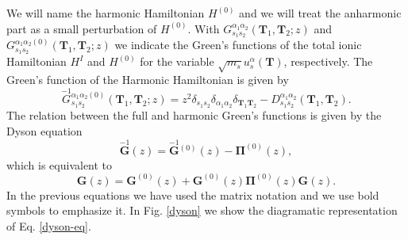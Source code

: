 We will name the harmonic Hamiltonian $H^{(0)}$ and we will treat the anharmonic part as a small perturbation of $H^{(0)}$. With $G_{s_{1}s_{2}}^{\alpha_{1}\alpha_{2}}(\mathbf{T}_{1},\mathbf{T}_{2};z)$ and 
$G_{s_{1}s_{2}}^{\alpha_{1}\alpha_{2}(0)}(\mathbf{T}_{1},\mathbf{T}_{2};z)$ we indicate the Green's functions of the total ionic Hamiltonian $H^{I}$ and $H^{(0)}$ for the variable $\sqrt{m_{s}}u_{s}^{\alpha}(\mathbf{T})$, 
respectively. The Green's function of the Harmonic Hamiltonian is given by
\begin{equation}
 \overset{-1}{G}{}_{s_{1}s_{2}}^{\alpha_{1}\alpha_{2}(0)}(\mathbf{T}_{1},\mathbf{T}_{2};z)=z^{2}\delta_{s_{1}s_{2}}\delta_{\alpha_{1}\alpha_{2}}\delta_{\mathbf{T}_{1}\mathbf{T}_{2}}-D_{s_{1}s_{2}}^{\alpha_{1}\alpha_{2}}(\mathbf{
 T}_{1},\mathbf{T}_{2}).
\end{equation}
The relation between the full and harmonic Green's functions is given by the Dyson equation
\begin{equation}
 \label{green-function}
 \overset{-1}{\mathbf{G}}(z)=\overset{-1}{\mathbf{G}}{}^{(0)}(z)-\boldsymbol{\Pi}^{(0)}(z),
\end{equation}
which is equivalent to
\begin{equation}
 \label{dyson-eq}
 \mathbf{G}(z)=\mathbf{G}^{(0)}(z)+\mathbf{G}^{(0)}(z)\boldsymbol{\Pi}^{(0)}(z)\mathbf{G}(z).
\end{equation}
In the previous equations we have used the matrix notation and we use bold symbols to emphasize it. In Fig. \ref{dyson} we show the diagramatic representation of Eq. \ref{dyson-eq}. 
